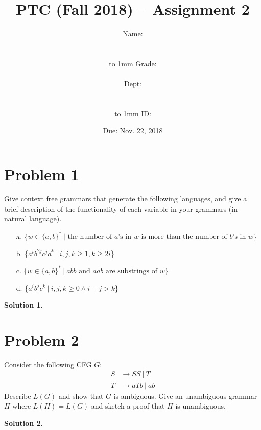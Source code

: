 \documentclass[a4paper,UTF8]{article}
\theoremstyle{definition}
\newtheorem*{solution}{Solution}
\begin{document}
\title{PTC (Fall 2018) -- Assignment 2}
\author{
    \begin{minipage}[b]{0.3\linewidth}
      \begin{flushright}
        Name: \rule{3cm}{0.4pt}\\
        \vbox to 1mm{}
        Grade: \rule{3cm}{0.4pt}
      \end{flushright}
    \end{minipage}
    \hfill
    \begin{minipage}[b]{0.3\linewidth}
      \begin{flushright}
        Dept: \rule{3cm}{0.4pt}\\
        \vbox to 1mm{}
        ID: \rule{3cm}{0.4pt}
      \end{flushright}
    \end{minipage}
}
\date{\color{red} \Large Due: Nov. 22, 2018}
\maketitle

\section*{Problem 1}
Give context free grammars that generate the following languages, and give a brief description of the functionality of each variable in your grammars (in natural language).
\begin{enumerate}
  \item[a.] \{$w\in \{a,b\}^*\ |\mbox{ the number of $a$'s in $w$ is more than the number of $b$'s in $w$}$\}
  \item[b.] \{$a^ib^{2j}c^{j}d^{k}\ |\ i,j,k\geq 1, k \geq 2i$\}
  \item[c.] \{$w\in \{a,b\}^*\ |\ abb\mbox{ and }aab\mbox{ are substrings of }w$\}
  \item[d.] \{$a^{i}b^{j}c^{k}\ |\ i,j,k\geq 0 \wedge i + j > k$\} 
\end{enumerate}
\begin{solution}
\end{solution}
\newpage

\section*{Problem 2}
Consider the following CFG $G$:
\[
\begin{aligned}
  S &\rightarrow SS\ |\ T \\
  T &\rightarrow aTb\ |\ ab
\end{aligned}
\]
Describe $L(G)$ and show that $G$ is ambiguous. Give an unambiguous grammar $H$
where $L(H) = L(G)$ and sketch a proof that $H$ is unambiguous.
\begin{solution}
\end{solution}
\newpage
\end{document}
